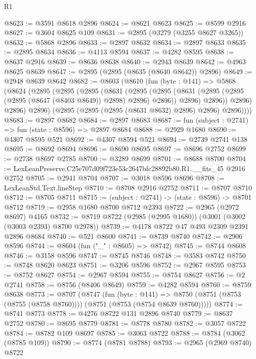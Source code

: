 \begin{lexlean}{R1}
\begin{coremodule}
@8623 := @3591 @8618 @2896
@8624 := @8621 @8623
@8625 := @8599 @2916
@8627 := @3604 @8625 @109
@8631 := @2895 (@3279 (@3255 @8627 @3265))
@8632 := @5868 @2896
@8633 := @2897 @8632
@8634 := @2897 @8633
@8635 := @2895 @8634
@8636 := @4113 @8594
@8637 := @4282 @8595
@8638 := @8637 @2916
@8639 := @8636 @8638
@8640 := @2943 @8639
@8642 := @4963 @8625 @8639
@8647 := @2895 (@2895 (@8635 (@8640 @8642)) @2896)
@8649 := @2948 @8639 @8642
@8682 := @8603
    (@8610
      (fun (byte : @141) =>
      @5868
        (@8624
          (@2895
            (@2895
              (@2895
                (@8631
                  (@2895
                    (@2895
                      (@8631 (@2895 (@2895 (@2895 (@8647 (@8403 @8649)) @2898) @2896) @2896))
                      @2896)
                    @2896))
                @2896)
              @2896)
            @2896)
          (@2895 (@2895 (@2895 (@8631 @8632) @2896) @2896) @2896))))
@8683 := @2897 @8682
@8684 := @2897 @8683
@8687 := fun (subject : @2741) => fun (state : @8596) => @2897 @8684
@8688 := @2929 @1680
@8690 := @4307 @8595 @521
@8692 := @4307 @8594 @521
@8694 := @2739 @2741 @138
@8695 := @8692 @8694
@8696 := @8690 @8695
@8697 := @8696 @2752
@8699 := @2738 @8697 @2785
@8700 := @3289 @8699
@8701 := @8688 @8700
@8704 := LexLeanPreserve.C25e707d09f723e53c2647bfc28892b80.R1.__fits_45 @2916 @2752
@8705 := @2941 @8704
@8707 := @3018 @8596 @8696
@8708 := LexLeanStd.Text.lineStep
@8710 := @8708 @2916 @2752
@8711 := @8707 @8710
@8712 := @8705 @8711
@8715 := (subject : @2741) -> (state : @8596) -> @8701 @8712
@8719 := @2958 @1680 @8700 @8712 @2393
@8722 := @2965 (@2972 @8697) @4165
@8732 := @8719 @8722 (@2985 (@2995 @1680)) (@3001 (@3002 (@3003 @2393) @8700 @2978))
@8739 := @4178 @8722 @47 @493 @2309 @2391 @2896 @8684
@8740 := @521 @8600
@8741 := @8739 @8740
@8742 := @2906 @8596
@8744 := @8604 (fun ("_" : @8605) => @8742)
@8745 := @8744 @8608
@8746 := @3158 @8596
@8747 := @8745 @8746
@8748 := @3583 @8742
@8750 := @8748 @8620 @8623
@8751 := @3206 @8596
@8752 := @2967 @8595
@8753 := @8752 @8627
@8754 := @2967 @8594
@8755 := @8754 @8627
@8756 := @2 @2741
@8758 := @8756 (@8406 @8649)
@8759 := @4282 @8594
@8760 := @8759 @8638
@8773 := @8707
    (@8747
      (fun (byte : @141) =>
      @8750 (@8751 (@8753 (@8755 (@8758 @8760)))) (@8751 (@8753 (@8754 @8639 @8760)))))
@8774 := @8741 @8773
@8778 := @4276 @8722 @131 @2896 @8740
@8779 := @8637 @2752
@8780 := @8695 @8779
@8781 := @8778 @8780
@8782 := @3057 @8722
@8784 := @8782 @109 @8697
@8785 := @3063 @8722
@8788 := @8784 (@3062 (@8785 @109))
@8790 := @8774 (@8781 @8788)
@8793 := @2965 (@2969 @8740) @8722

\end{coremodule}
\end{lexlean}
